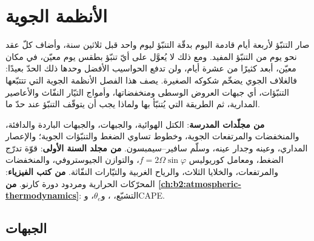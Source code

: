\chapter{الأنظمة الجوية}\label{ch:b2:weather-systems}

صار التنبّؤ لأربعة أيام قادمة اليوم بدقّة التنبّؤ ليوم واحد قبل ثلاثين
سنة، وأضاف كلّ عقد نحو يوم من التنبّؤ المفيد. ومع ذلك لا يُعوَّل على أيّ تنبّؤ بطقس
يوم معيّن، في مكان معيّن، أبعد كثيرًا من عشرة أيام، ولن تدفع الحواسيب الأفضل
وحدها ذلك الحدّ بعيدًا: فالغلاف الجوي يضخّم شكوكه الصغيرة. يصف هذا
الفصل الأنظمة الجوية التي تتتبّعها التنبّؤات، أي جبهات العروض الوسطى ومنخفضاتها،
وأمواج التيّار النفّاث والأعاصير المدارية، ثم الطريقة التي
يُتنبّأ بها ولماذا يجب أن يتوقّف التنبّؤ عند حدّ ما.

\begin{recall}
\textbf{من مجلّدات المدرسة}: الكتل الهوائية، والجبهات، والجبهات الباردة والدافئة، والمنخفضات
والمرتفعات الجوية، وخطوط تساوي الضغط والتنبّؤات الجوية؛ والإعصار المداري، وعينه وجدار عينه،
وسلّم سافير--سيمبسون. \textbf{من مجلد السنة الأولى}: قوّة تدرّج الضغط،
ومعامل كوريوليس $f = 2\Omega\sin\varphi$، والتوازن الجيوستروفي، والمنخفضات والمرتفعات،
والخلايا الثلاث، والرياح الغربية والتيّارات النفّاثة. \textbf{من كتب الفيزياء}: المحرّكات الحرارية
ومردود دورة كارنو. \textbf{من \cref{ch:b2:atmospheric-thermodynamics}}:
التشبّع، ، و$\theta_e$،  وCAPE.
\end{recall}

\section{الجبهات}\label{sec:b2:weather-systems:fronts}

